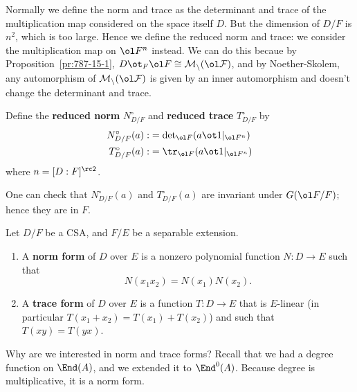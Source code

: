 Normally we define the norm and trace as the determinant and trace of the multiplication map considered on the space itself $D$. But the dimension of $D/F$ is $n^2$, which is too large. Hence we define the reduced norm and trace: we consider the multiplication map on $\ol F^n$ instead. We can do this becaue by Proposition~\ref{pr:787-15-1}, $D\ot_F\ol F\cong \cal M_n(\ol F)$, and by Noether-Skolem, any automorphism of $\cal M_n(\ol F)$ is given by an inner automorphism and doesn't change the determinant and trace.
\begin{df}
Define the \textbf{reduced norm} $N_{D/F}^{\circ}$ and \textbf{reduced trace} $T_{D/F}^{\circ}$ by
\begin{align*}
N_{D/F}^{\circ}(a):&=\text{det}_{\ol F}(a\ot 1|_{\ol F^n})\\
T_{D/F}^{\circ}(a):&=\tr_{\ol F}(a\ot 1|_{\ol F^n})
\end{align*}
where $n=[D:F]^{\rc 2}$. 
\end{df}
One can check that $N_{D/F}^{\circ}(a)$ and $T_{D/F}^{\circ}(a)$ are invariant under $G(\ol F/F)$; hence they are in $F$.


\begin{df}
Let $D/F$ be a CSA, and $F/E$ be a separable extension.
\begin{enumerate}
\item
A \textbf{norm form} of $D$ over $E$ is a nonzero polynomial function $N:D\to E$ such that
\[
N(x_1x_2)=N(x_1)N(x_2).
\]
\item
A \textbf{trace form} of $D$ over $E$ is a function $T:D\to E$ that is $E$-linear (in particular $T(x_1+x_2)=T(x_1)+T(x_2)$) and such that $T(xy)=T(yx)$.
\end{enumerate}
\end{df}

Why are we interested in norm and trace forms? Recall that we had a degree function on $\End(A)$, and we extended it to $\End^0(A)$. Because degree is multiplicative, it is a norm form. 

